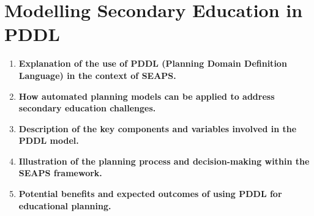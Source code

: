 \section{Modelling Secondary Education in PDDL}
\begin{enumerate}
    \item \textbf{Explanation of the use of PDDL (Planning Domain Definition Language) in the context of SEAPS.}
    \item \textbf{How automated planning models can be applied to address secondary education challenges.}
    \item \textbf{Description of the key components and variables involved in the PDDL model.}
    \item \textbf{Illustration of the planning process and decision-making within the SEAPS framework.}
    \item \textbf{Potential benefits and expected outcomes of using PDDL for educational planning.}
\end{enumerate}
